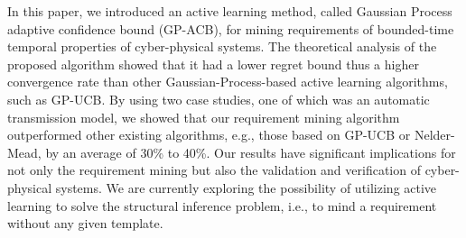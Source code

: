\documentclass[10pt]{article}
\theoremstyle{plain}
\begin{document}
In this paper, we introduced an active learning method, called Gaussian Process adaptive confidence bound (GP-ACB), for mining requirements of bounded-time temporal properties of cyber-physical systems. The theoretical analysis of the proposed algorithm showed that it had a lower regret bound thus a higher convergence rate than other Gaussian-Process-based active learning algorithms, such as GP-UCB. By using two case studies, one of which was an automatic transmission model, we showed that our requirement mining algorithm outperformed other existing algorithms, e.g., those based on GP-UCB or Nelder-Mead, by an average of 30\% to 40\%. Our results have significant implications for not only the requirement mining but also the validation and verification of cyber-physical systems. We are currently exploring the possibility of utilizing active learning to solve the structural inference problem, i.e., to mind a requirement without any given template. 




     
\end{document}
